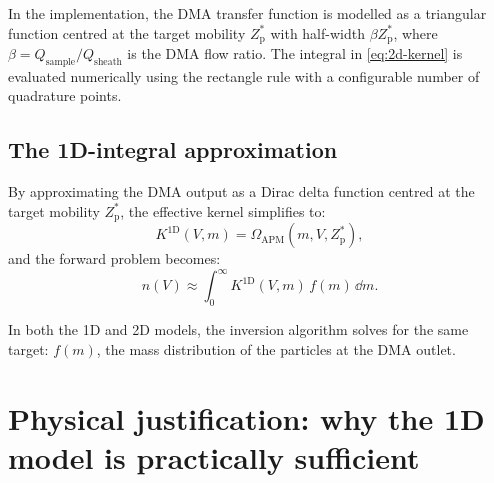 \documentclass[11pt,a4paper]{article}
\begin{document}
In the implementation, the DMA transfer function is modelled as a triangular
function centred at the target mobility $Z_{\mathrm{p}}^{*}$ with half-width
$\beta Z_{\mathrm{p}}^{*}$, where
$\beta = Q_{\mathrm{sample}}/Q_{\mathrm{sheath}}$ is the DMA flow ratio.
The integral in \eqref{eq:2d-kernel} is evaluated numerically using the
rectangle rule with a configurable number of quadrature points.

\subsection{The 1D-integral approximation}
\label{sec:1d-model}

By approximating the DMA output as a Dirac delta function centred at the
target mobility $Z_{\mathrm{p}}^{*}$, the effective kernel simplifies to:
\begin{equation}
  K^{\mathrm{1D}}(V, m) =
    \Omega_{\mathrm{APM}}(m, V, Z_{\mathrm{p}}^{*}),
  \label{eq:1d-kernel}
\end{equation}
and the forward problem becomes:
\begin{equation}
  n(V) \approx \int_{0}^{\infty}
    K^{\mathrm{1D}}(V, m) \, f(m) \, \dd m.
  \label{eq:1d-forward}
\end{equation}

In both the 1D and 2D models, the inversion algorithm solves for the same
target: $f(m)$, the mass distribution of the particles at the DMA outlet.

\section{Physical justification: why the 1D model is practically sufficient}
\label{sec:1d-justification}
\end{document}
